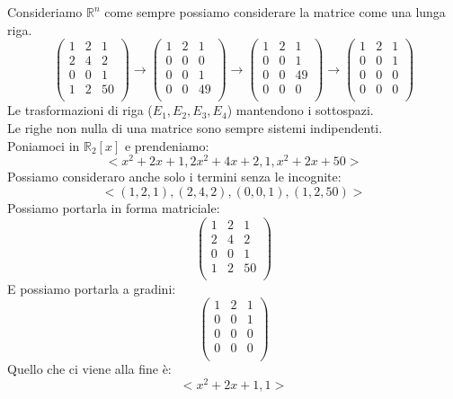 Consideriamo $\mathbb{R}^n$ come sempre possiamo considerare la matrice come una lunga riga.
$$
\begin{pmatrix}
1 & 2 & 1 \\
2 & 4 & 2 \\
0 & 0 & 1 \\
1 & 2 & 50\\
\end{pmatrix}
\rightarrow
\begin{pmatrix}
1 & 2 & 1 \\
0 & 0 & 0 \\
0 & 0 & 1 \\
0 & 0 & 49\\
\end{pmatrix}
\rightarrow
\begin{pmatrix}
1 & 2 & 1 \\
0 & 0 & 1 \\
0 & 0 & 49 \\
0 & 0 & 0\\
\end{pmatrix}
\rightarrow
\begin{pmatrix}
1 & 2 & 1 \\
0 & 0 & 1 \\
0 & 0 & 0 \\
0 & 0 & 0 \\
\end{pmatrix}
$$
Le trasformazioni di riga ($E_1,E_2,E_3,E_4$) mantendono i sottospazi.\\
Le righe non nulla di una matrice sono sempre sistemi indipendenti.\\
Poniamoci in $\mathbb{R}_2[x]$ e prendeniamo:
$$ <x^2+2x+1, 2x^2+4x+2, 1, x^2+2x+50> $$
Possiamo consideraro anche solo i termini senza le incognite:
$$ <(1,2,1),(2,4,2),(0,0,1),(1,2,50)> $$
Possiamo portarla in forma matriciale:
$$ 
\begin{pmatrix}
1 & 2 & 1 \\
2 & 4 & 2 \\
0 & 0 & 1 \\
1 & 2 & 50 \\
\end{pmatrix}
$$
E possiamo portarla a gradini:
$$
\begin{pmatrix}
1 & 2 & 1 \\
0 & 0 & 1 \\
0 & 0 & 0 \\
0 & 0 & 0 \\
\end{pmatrix}
$$
Quello che ci viene alla fine è:
$$ <x^2+2x+1, 1> $$

